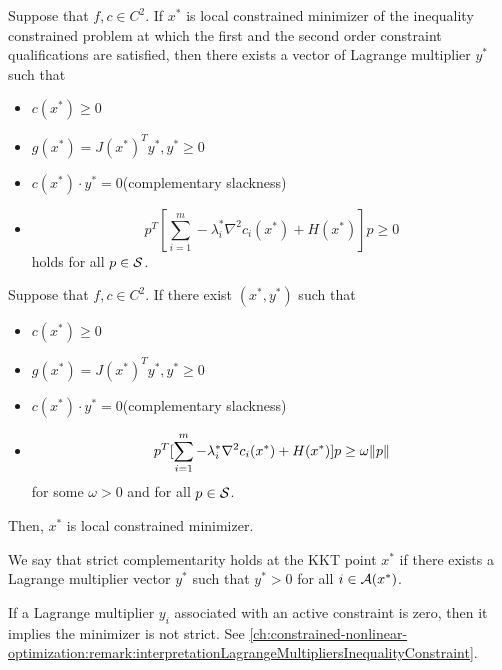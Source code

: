 \begin{refsection}
\begin{theorem}\label{ch:constrained-nonlinear-optimization:th:secondorderKKTinequalitynecessary}\cite[lec 4]{Robinson2015nonlinear2}
Suppose that $f,c\in C^2$. If $x^*$ is local constrained minimizer of the inequality constrained problem at which the first and the second order constraint qualifications are satisfied, then there exists a vector of Lagrange multiplier $y^*$ such that
\begin{itemize}
	\item $c(x^*)\geq 0$
	\item $g(x^*) = J(x^*)^Ty^*, y^*\geq 0$
	\item $c(x^*)\cdot y^* = 0$(complementary slackness)
	\item $$p^T[\sum_{i=1}^m -\lambda_i^* \nabla^2 c_i(x^*) + H(x^*)]p \geq 0$$
	holds for all $p\in \mathcal{S} $.
\end{itemize}
\end{theorem}



\begin{theorem}\label{ch:constrained-nonlinear-optimization:th:secondorderKKTinequalitysufficient}\cite[lec 4]{Robinson2015nonlinear2}
Suppose that $f,c\in C^2$. If there exist $(x^*,y^*)$ such that
\begin{itemize}
	\item $c(x^*)\geq 0$
	\item $g(x^*) = J(x^*)^Ty^*, y^*\geq 0$
	\item $c(x^*)\cdot y^* = 0$(complementary slackness)
	\item $$p^T[\sum_{i=1}^m -\lambda_i^* \nabla^2 c_i(x^*) + H(x^*)]p \geq \omega \norm{p}$$
	for some $\omega > 0$ and for all $p\in \mathcal{S} $.
\end{itemize}
Then, $x^*$ is local constrained minimizer.
\end{theorem}

\begin{definition}
We say that strict complementarity holds at the KKT point $x^*$ if there exists a Lagrange multiplier vector $y^*$ such that $y^* > 0$ for all $i\in \mathcal{A}(x^*)$.
\end{definition}

\begin{remark}
If a Lagrange multiplier $y_i$ associated with an active constraint is zero, then it implies the minimizer is not strict. See \autoref{ch:constrained-nonlinear-optimization:remark:interpretationLagrangeMultipliersInequalityConstraint}. 
\end{remark}



\end{refsection}
